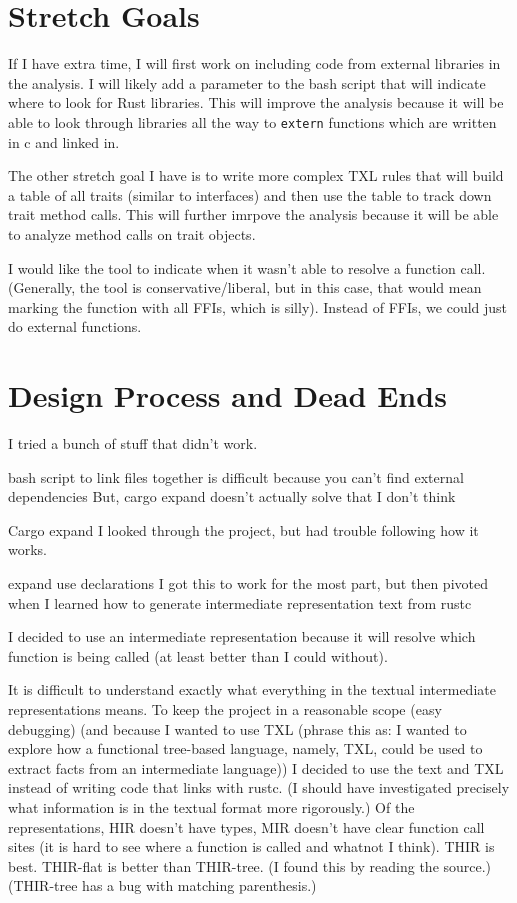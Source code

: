 \documentclass[11pt]{article}
\begin{document}
\section{Stretch Goals}
If I have extra time, I will first work on including code from external libraries in the analysis.
I will likely add a parameter to the bash script that will indicate where to look for Rust libraries.
This will improve the analysis because it will be able to look through libraries all the way to \lstinline{extern} functions which are written in c and linked in.

The other stretch goal I have is to write more complex TXL rules that will build a table of all traits (similar to interfaces) and then use the table to track down trait method calls.
This will further imrpove the analysis because it will be able to analyze method calls on trait objects.

I would like the tool to indicate when it wasn't able to resolve a function call.
(Generally, the tool is conservative/liberal, but in this case, that would mean marking the function with all FFIs, which is silly).
Instead of FFIs, we could just do external functions.

\section{Design Process and Dead Ends}
I tried a bunch of stuff that didn't work.

bash script to link files together is difficult because you can't find external dependencies
But, cargo expand doesn't actually solve that I don't think

Cargo expand
I looked through the project, but had trouble following how it works.

expand use declarations
I got this to work for the most part, but then pivoted when I learned how to generate intermediate representation text from rustc

I decided to use an intermediate representation because it will resolve which function is being called (at least better than I could without).

It is difficult to understand exactly what everything in the textual intermediate representations means.
To keep the project in a reasonable scope (easy debugging) (and because I wanted to use TXL (phrase this as: I wanted to explore how a functional tree-based language, namely, TXL, could be used to extract facts from an intermediate language)) I decided to use the text and TXL instead of writing code that links with rustc.
(I should have investigated precisely what information is in the textual format more rigorously.)
Of the representations, HIR doesn't have types, MIR doesn't have clear function call sites (it is hard to see where a function is called and whatnot I think).
THIR is best.
THIR-flat is better than THIR-tree. (I found this by reading the source.)
(THIR-tree has a bug with matching parenthesis.)
\end{document}
